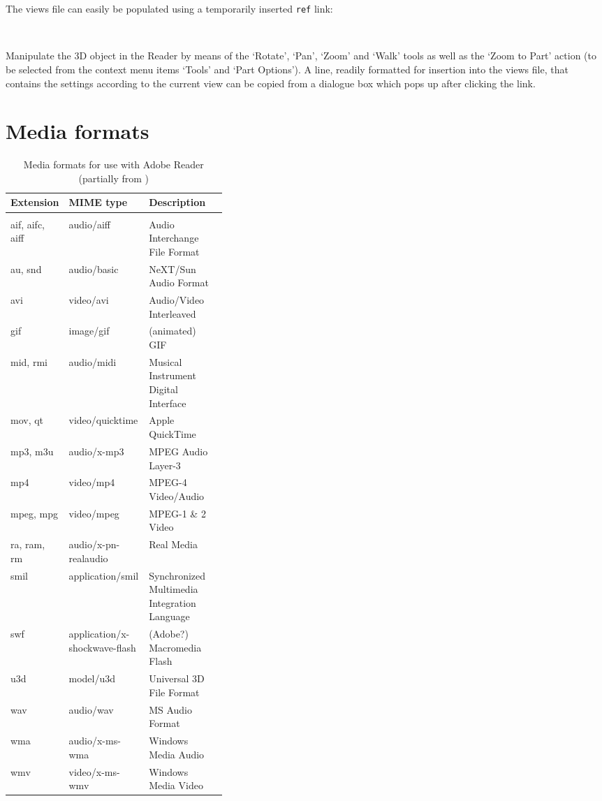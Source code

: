 \documentclass[a4paper]{article}
\begin{document}
\begin{enumerate}
  The views file can easily be populated using a temporarily inserted {\tt \string\movie\-ref} link:

  {\tt%
    \string\movieref[3Dgetview]
  }

  Manipulate the 3D object in the Reader by means of the `Rotate', `Pan', `Zoom' and `Walk' tools as well as the `Zoom to Part' action (to be selected from the context menu items `Tools' and `Part Options'). A line, readily formatted for insertion into the views file, that contains the settings according to the current view can be copied from a dialogue box which pops up after clicking the link.
\end{enumerate}

\section{Media formats}
\begin{table}[H]
\caption{Media formats for use with Adobe Reader (partially from \cite{pdfspec})}\label{table:mime}
\RaggedRight
\begin{tabular}[t]{llp{0.36\linewidth}}\hline
Extension & MIME type & Description\\\hline\hline\\[-2.5ex]
aif, aifc, aiff & audio/aiff & Audio Interchange File Format\\
au, snd         & audio/basic & NeXT/Sun Audio Format\\
avi             & video/avi & Audio/Video Interleaved\\
gif             & image/gif & (animated) GIF\\
mid, rmi        & audio/midi & Musical Instrument Digital Interface\\
mov, qt         & video/quicktime & Apple QuickTime\\
mp3, m3u        & audio/x-mp3 & MPEG Audio Layer-3\\
mp4             & video/mp4 & MPEG-4 Video/Audio\\
mpeg, mpg       & video/mpeg & MPEG-1 \& 2 Video\\
ra, ram, rm     & audio/x-pn-realaudio & Real Media\\
smil            & application/smil & Synchronized Multimedia Integration Language\\
swf             & application/x-shockwave-flash & (Adobe?) Macromedia Flash\\
u3d             & model/u3d  & Universal 3D File Format\\
wav             & audio/wav  & MS Audio Format\\
wma             & audio/x-ms-wma & Windows Media Audio\\
wmv             & video/x-ms-wmv & Windows Media Video\\\hline
\end{tabular}
\end{table}
\end{document}
